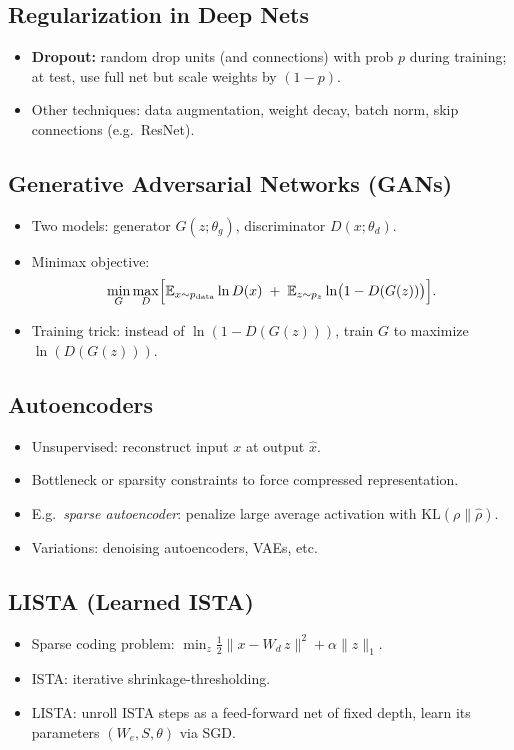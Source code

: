 \documentclass[10pt]{article}
\begin{document}
\begin{multicols}{2}
\subsection*{Regularization in Deep Nets}
\begin{itemize}
\item \textbf{Dropout:} random drop units (and connections) with prob $p$ during training; at test, use full net but scale weights by $(1-p)$.
\item Other techniques: data augmentation, weight decay, batch norm, skip connections (e.g.\ ResNet).
\end{itemize}

\subsection*{Generative Adversarial Networks (GANs)}
\begin{itemize}
\item Two models: generator $G(z;\theta_g)$, discriminator $D(x;\theta_d)$.
\item Minimax objective:
\[
\min_G \max_D \Bigl[
\mathbb{E}_{x\sim p_{\text{data}}}\ln D(x)
\;+\;
\mathbb{E}_{z\sim p_z}\ln\bigl(1-D(G(z))\bigr)
\Bigr].
\]
\item Training trick: instead of $\ln(1-D(G(z)))$, train $G$ to maximize $\ln (D(G(z)))$.
\end{itemize}

\subsection*{Autoencoders}
\begin{itemize}
\item Unsupervised: reconstruct input $x$ at output $\hat{x}$.
\item Bottleneck or sparsity constraints to force compressed representation.
\item E.g.\ \emph{sparse autoencoder}: penalize large average activation with $\mathrm{KL}(\rho\|\hat{\rho})$.
\item Variations: denoising autoencoders, VAEs, etc.
\end{itemize}

\subsection*{LISTA (Learned ISTA)}
\begin{itemize}
\item Sparse coding problem: $\min_z \tfrac12\|x - W_d\,z\|^2 + \alpha\|z\|_1$.
\item ISTA: iterative shrinkage-thresholding. 
\item LISTA: unroll ISTA steps as a feed-forward net of fixed depth, learn its parameters $(W_e,S,\theta)$ via SGD.
\end{itemize}


\end{multicols}
\end{document}
